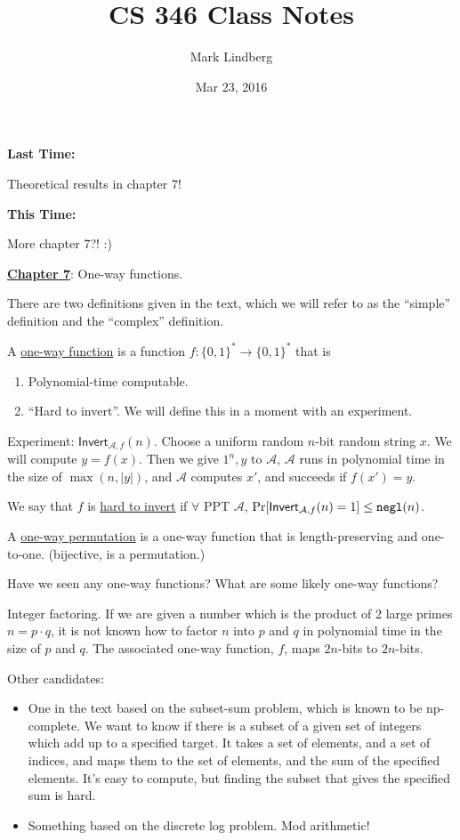 \documentclass[12pt]{article}
\newcommand{\AAA}{\mathcal{A}}
\newcommand{\ExptINVTArgs}[2]{\mathsf{Invert}_{#1,#2}}
\newcommand{\ExptINVT}{\ExptINVTArgs{\AAA}{f}}
\newcommand{\negl}{{\tt negl}}
\begin{document}
\title{CS 346 Class Notes}
\date{Mar 23, 2016}
\author{Mark Lindberg}
\maketitle
\thispagestyle{fancy}

{\bf Last Time:}

Theoretical results in chapter 7!

{\bf This Time:}

More chapter 7?! :)

\underline{\bf Chapter 7}: One-way functions.

There are two definitions given in the text, which we will refer to as the ``simple'' definition and the ``complex'' definition.

A \underline{one-way function} is a function $f:\{0,1\}^*\to\{0,1\}^*$ that is\begin{enumerate}

\item Polynomial-time computable.

\item ``Hard to invert''. We will define this in a moment with an experiment.

\end{enumerate}

Experiment: $\ExptINVT(n)$. Choose a uniform random $n$-bit random string $x$. We will compute $y=f(x)$. Then we give $1^n, y$ to $\AAA$, $\AAA$ runs in polynomial time in the size of $\max(n,|y|)$, and $\AAA$ computes $x'$, and succeeds if $f(x')=y$.

We say that $f$ is \underline{hard to invert} if $\forall$ PPT $\AAA$, $\Pr[\ExptINVT(n)=1]\leq\negl(n)$.

A \underline{one-way permutation} is a one-way function that is length-preserving and one-to-one. (bijective, is a permutation.)

Have we seen any one-way functions? What are some likely one-way functions?

Integer factoring. If we are given a number which is the product of 2 large primes $n=p\cdot q$, it is not known how to factor $n$ into $p$ and $q$ in polynomial time in the size of $p$ and $q$. The associated one-way function, $f$, maps $2n$-bits to $2n$-bits. 

Other candidates: \begin{itemize}

\item One in the text based on the subset-sum problem, which is known to be np-complete. We want to know if there is a subset of a given set of integers which add up to a specified target. It takes a set of elements, and a set of indices, and maps them to the set of elements, and the sum of the specified elements. It's easy to compute, but finding the subset that gives the specified sum is hard.

\item Something based on the discrete log problem. Mod arithmetic!

\end{itemize}
\end{document}
